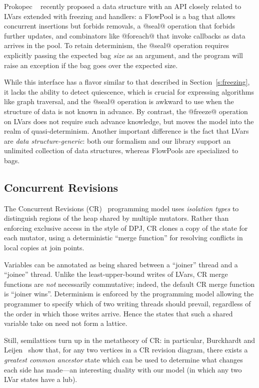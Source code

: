 \documentclass{article}
\begin{document}
Prokopec \etal~\cite{flowpools} recently proposed a data structure
with an API closely related to LVars extended with freezing and
handlers: a FlowPool is a bag that allows concurrent insertions but
forbids removals, a @seal@ operation that forbids further updates,
and combinators like @foreach@ that invoke callbacks as data
arrives in the pool.  To retain determinism, the @seal@ operation
requires explicitly passing the expected bag \emph{size} as an
argument, and the program will raise an exception if the bag goes over
the expected size.

While this interface has a flavor similar to that described in
Section~\ref{s:freezing}, it lacks the ability to detect quiescence,
which is crucial for expressing algorithms like graph traversal, and
the @seal@ operation is awkward to use when the structure of data is
not known in advance.  By contrast, the @freeze@ operation on LVars
does not require such advance knowledge, but moves the model into the
realm of quasi-determinism.  Another important difference is the fact
that LVars are \emph{data structure-generic}: both our formalism and
our library support an unlimited collection of data structures,
whereas FlowPools are specialized to bags.

\subsection{Concurrent Revisions}

The Concurrent Revisions (CR)~\cite{concurrent-revisions-haskell11}
programming model uses \emph{isolation types} \cite{isolation-types}
to distinguish regions of the heap shared by multiple mutators.
Rather than enforcing exclusive access in the style of DPJ, CR clones
a copy of the state for each mutator, using a deterministic ``merge
function'' for resolving conflicts in local copies at join points.

Variables can be annotated as being shared between a ``joiner'' thread
and a ``joinee'' thread.  Unlike the least-upper-bound writes of
LVars, CR merge functions are \emph{not} necessarily commutative;
indeed, the default CR merge function is ``joiner wins''.  Determinism
is enforced by the programming model allowing the programmer to
specify which of two writing threads should prevail, regardless of the
order in which those writes arrive.  Hence the states that such a
shared variable take on need not form a lattice.

Still, semilattices turn up in the metatheory of CR: in particular,
Burckhardt and Leijen~\cite{semantics-concurrent-revisions} show that,
for any two vertices in a CR revision diagram, there exists a
\emph{greatest common ancestor} state which can be used to determine
what changes each side has made---an interesting duality with our
model (in which any two LVar states have a lub). 
\end{document}
